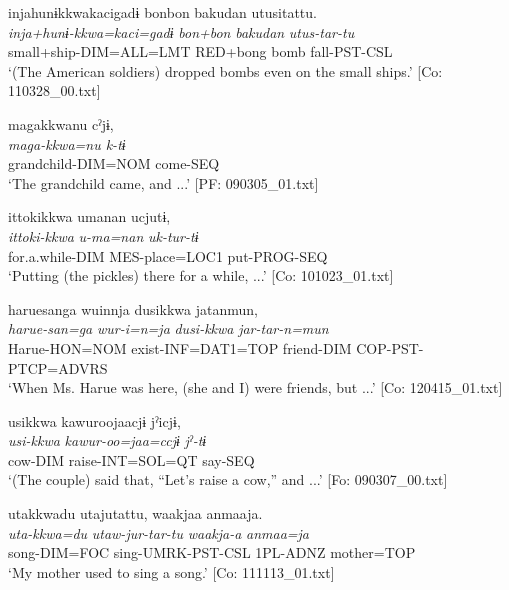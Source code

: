 \ex \label{ex:7:25c}%
\glll  injahunɨkkwakacigadɨ  {\textbar}bonbon  bakudan  utusi{\textbar}tattu.\\
\textit{inja+hunɨ-kkwa=kaci=gadɨ}  \textit{bon+bon}  \textit{bakudan}  \textit{utus-tar-tu}\\
small+ship-DIM=ALL=LMT  RED+bong  bomb  fall-PST-CSL\\
\glt ‘(The American soldiers) dropped bombs even on the small ships.’ [Co: 110328\_00.txt]

\ex \label{ex:7:25d}  %
\glll  magakkwanu  cˀjɨ,\\
\textit{maga{}-kkwa=nu  k-tɨ}\\
grandchild-DIM=NOM  come-SEQ\\
\glt ‘The grandchild came, and ...’ [PF: 090305\_01.txt]

\ex \label{ex:7:25e}  %
\glll  {\textbar}ittoki{\textbar}kkwa  umanan  ucjutɨ,\\
\textit{ittoki-kkwa}  \textit{u-ma=nan}  \textit{uk-tur-tɨ}\\
for.a.while-DIM  MES-place=LOC1  put-PROG-SEQ\\
\glt ‘Putting (the pickles) there for a while, ...’ [Co: 101023\_01.txt]

 \ex \label{ex:7:25f}
\glll  haruesanga  wuinnja  dusikkwa  jatanmun,\\
\textit{harue-san=ga}  \textit{wur-i=n=ja}  \textit{dusi-kkwa}  \textit{jar-tar-n=mun}\\
Harue-HON=NOM  exist{}-INF=DAT1=TOP  friend-DIM  COP-PST-PTCP=ADVRS\\
\glt ‘When Ms. Harue was here, (she and I) were friends, but ...’ [Co: 120415\_01.txt]

\ex \label{ex:7:25g}  %
\glll  usikkwa  kawuroojaacjɨ  jˀicjɨ,\\
\textit{usi-kkwa}  \textit{kawur-oo=jaa=ccjɨ}  \textit{jˀ-tɨ}\\
cow-DIM  raise-INT=SOL=QT  say-SEQ\\
\glt ‘(The couple) said that, “Let’s raise a cow,” and ...’ [Fo: 090307\_00.txt]

\ex \label{ex:7:25h} %
\glll  utakkwadu  utajutattu,  waakjaa  anmaaja.\\
\textit{uta-kkwa=du}  \textit{utaw-jur-tar-tu}  \textit{waakja-a}  \textit{anmaa=ja}\\
song-DIM=FOC  sing-UMRK-PST-CSL  1PL-ADNZ  mother=TOP\\
\glt ‘My mother used to sing a song.’ [Co: 111113\_01.txt]

